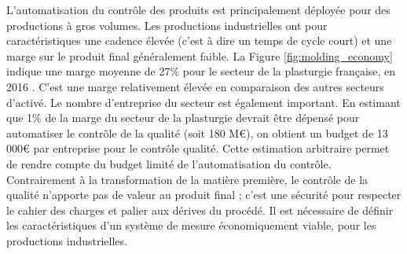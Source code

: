 L'automatisation du contrôle des produits est principalement déployée pour des productions à gros volumes.
Les productions industrielles ont pour caractéristiques une cadence élevée (c'est à dire un temps de cycle court) et une marge sur le produit final généralement faible.
La Figure \ref{fig:molding_economy} indique une marge moyenne de 27\% pour le secteur de la plasturgie française, en 2016 \cite{directiongeneraledesentreprises_chiffres_2019}.
C'est une marge relativement élevée en comparaison des autres secteurs d'activé.
Le nombre d'entreprise du secteur est également important.
En estimant que 1\% de la marge du secteur de la plasturgie devrait être dépensé pour automatiser le contrôle de la qualité (soit 180 M€), on obtient un budget de 13 000€ par entreprise pour le contrôle qualité.
Cette estimation arbitraire permet de rendre compte du budget limité de l'automatisation du contrôle.
Contrairement à la transformation de la matière première, le contrôle de la qualité n'apporte pas de valeur au produit final ; c'est une sécurité pour respecter le cahier des charges et palier aux dérives du procédé.
Il est nécessaire de définir les caractéristiques d'un système de mesure économiquement viable, pour les productions industrielles.


